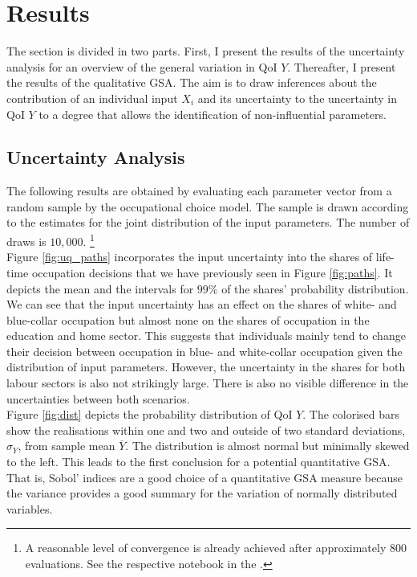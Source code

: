 \section{Results}

The section is divided in two parts. First, I present the results of the uncertainty analysis for an overview of the general variation in QoI $Y$. Thereafter, I present the results of the qualitative GSA. The aim is to draw inferences about the contribution of an individual input $X_i$ and its uncertainty to the uncertainty in QoI $Y$ to a degree that allows the identification of non-influential parameters.

\subsection{Uncertainty Analysis}
The following results are obtained by evaluating each parameter vector from a random sample by the occupational choice model. The sample is drawn according to the estimates for the joint distribution of the input parameters. The number of draws is $10,000$. \footnote{A reasonable level of convergence is already achieved after approximately 800 evaluations. See the respective notebook in the .}\\

\noindent
Figure \ref{fig:uq_paths} incorporates the input uncertainty into the shares of life-time occupation decisions that we have previously seen in Figure \ref{fig:paths}. It depicts the mean and the intervals for $99\%$ of the shares' probability distribution. We can see that the input uncertainty has an effect on the shares of white- and blue-collar occupation but almost none on the shares of occupation in the education and home sector. This suggests that individuals mainly tend to change their decision between occupation in blue- and white-collar occupation given the distribution of input parameters. However, the uncertainty in the shares for both labour sectors is also not strikingly large. There is also no visible difference in the uncertainties between both scenarios.\\


\noindent
Figure \ref{fig:dist} depicts the probability distribution of QoI $Y$. The colorised bars show the realisations within one and two and outside of two standard deviations, $\sigma_Y$, from sample mean $\overline{Y}$.  The distribution is almost normal but minimally skewed to the left. This leads to the first conclusion for a potential quantitative GSA. That is, Sobol' indices are a good choice of a quantitative GSA measure because the variance provides a good summary for the variation of normally distributed variables.\\


